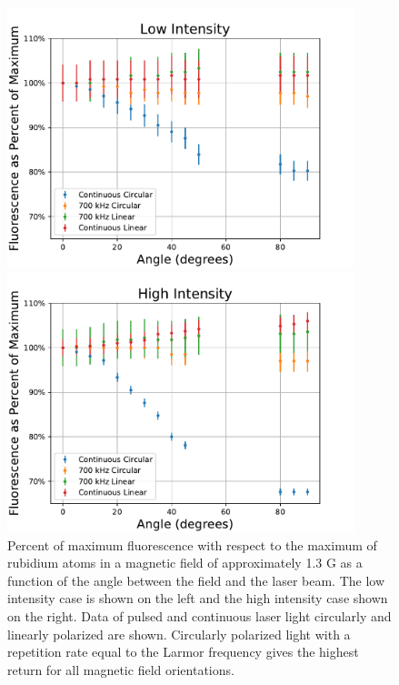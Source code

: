 \begin{figure}[htb]
	\centering
	\begin{minipage}{.48\textwidth}
	\centering
		\includegraphics[width=0.9\textwidth]{../../MRPData/April16/togetherscaled.pdf}
	\end{minipage}
	\begin{minipage}{.48\textwidth}
	\centering
		\includegraphics[width=0.9\textwidth]{../../MRPData/MAR24/togetherscaled.pdf}
	\end{minipage}
	\caption{Percent of maximum fluorescence with respect to the maximum of rubidium atoms in a magnetic field of approximately 1.3 G as a function of the angle between the field and the laser beam. The low intensity case is shown on the left and the high intensity case shown on the right. Data of pulsed and continuous laser light circularly and linearly polarized are shown. Circularly polarized light with a repetition rate equal to the Larmor frequency gives the highest return for all magnetic field orientations.}
	\label{fig:flvanglescaled}
\end{figure}

